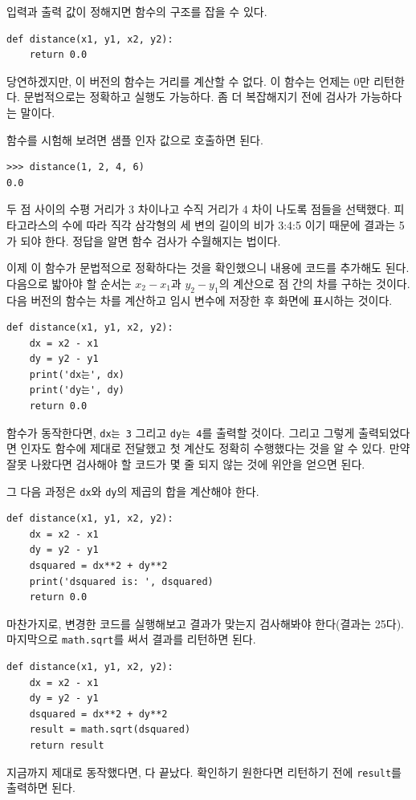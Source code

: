 \documentclass[10pt]{book}
\begin{document}
입력과 출력 값이 정해지면 함수의 구조를 잡을 수 있다. 

\begin{verbatim}
def distance(x1, y1, x2, y2):
    return 0.0
\end{verbatim}
%
당연하겠지만, 이 버전의 함수는 거리를 계산할 수 없다.  이 함수는 언제는
0만 리턴한다.  문법적으로는 정확하고 실행도 가능하다.  좀 더 복잡해지기
전에 검사가 가능하다는 말이다.

함수를 시험해 보려면 샘플 인자 값으로 호출하면 된다. 


\begin{verbatim}
>>> distance(1, 2, 4, 6)
0.0
\end{verbatim}
%
두 점 사이의 수평 거리가 3 차이나고 수직 거리가 4 차이 나도록 점들을
선택했다.  피타고라스의 수에 따라 직각 삼각형의 세 변의 길이의 비가
3:4:5 이기 때문에 결과는 5가 되야 한다.  정답을 알면 함수 검사가
수월해지는 법이다.

이제 이 함수가 문법적으로 정확하다는 것을 확인했으니 내용에 코드를
추가해도 된다.  다음으로 밟아야 할 순서는 $x_2 - x_1$과 $y_2 - y_1$의
계산으로 점 간의 차를 구하는 것이다.  다음 버전의 함수는 차를 계산하고
임시 변수에 저장한 후 화면에 표시하는 것이다.


\begin{verbatim}
def distance(x1, y1, x2, y2):
    dx = x2 - x1
    dy = y2 - y1
    print('dx는', dx)
    print('dy는', dy)
    return 0.0
\end{verbatim}
%
함수가 동작한다면, \verb"dx는 3" 그리고 \verb"dy는 4"를 출력할 것이다.
그리고 그렇게 출력되었다면 인자도 함수에 제대로 전달했고 첫 계산도
정확히 수행했다는 것을 알 수 있다.  만약 잘못 나왔다면 검사해야 할
코드가 몇 줄 되지 않는 것에 위안을 얻으면 된다.

그 다음 과정은 {\tt dx}와 {\tt dy}의 제곱의 합을 계산해야 한다. 

\begin{verbatim}
def distance(x1, y1, x2, y2):
    dx = x2 - x1
    dy = y2 - y1
    dsquared = dx**2 + dy**2
    print('dsquared is: ', dsquared)
    return 0.0
\end{verbatim}
%
마찬가지로, 변경한 코드를 실행해보고 결과가 맞는지 검사해봐야
한다(결과는 25다).  마지막으로 {\tt math.sqrt}를 써서 결과를 리턴하면
된다.

\begin{verbatim}
def distance(x1, y1, x2, y2):
    dx = x2 - x1
    dy = y2 - y1
    dsquared = dx**2 + dy**2
    result = math.sqrt(dsquared)
    return result
\end{verbatim}
%
지금까지 제대로 동작했다면, 다 끝났다.  확인하기 원한다면 리턴하기 전에
{\tt result}를 출력하면 된다. 
\end{document}
